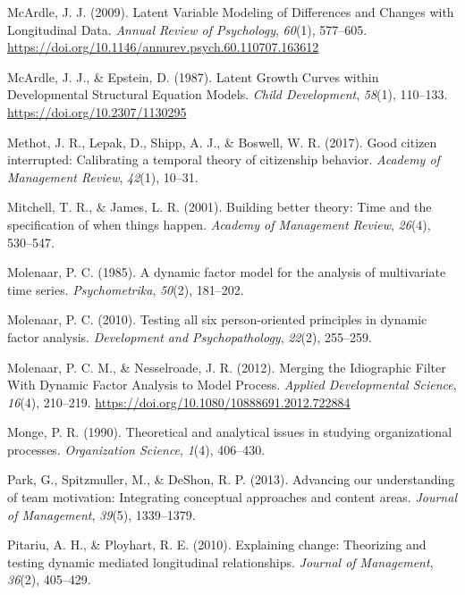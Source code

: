 \documentclass[english,,man]{apa6}
\begin{document}
\leavevmode\hypertarget{ref-mcardle_latent_2009}{}%
McArdle, J. J. (2009). Latent Variable Modeling of Differences and Changes with Longitudinal Data. \emph{Annual Review of Psychology}, \emph{60}(1), 577--605. \url{https://doi.org/10.1146/annurev.psych.60.110707.163612}

\leavevmode\hypertarget{ref-mcardle_latent_1987}{}%
McArdle, J. J., \& Epstein, D. (1987). Latent Growth Curves within Developmental Structural Equation Models. \emph{Child Development}, \emph{58}(1), 110--133. \url{https://doi.org/10.2307/1130295}

\leavevmode\hypertarget{ref-methot2017good}{}%
Methot, J. R., Lepak, D., Shipp, A. J., \& Boswell, W. R. (2017). Good citizen interrupted: Calibrating a temporal theory of citizenship behavior. \emph{Academy of Management Review}, \emph{42}(1), 10--31.

\leavevmode\hypertarget{ref-mitchell_building_2001}{}%
Mitchell, T. R., \& James, L. R. (2001). Building better theory: Time and the specification of when things happen. \emph{Academy of Management Review}, \emph{26}(4), 530--547.

\leavevmode\hypertarget{ref-molenaar_dynamic_1985}{}%
Molenaar, P. C. (1985). A dynamic factor model for the analysis of multivariate time series. \emph{Psychometrika}, \emph{50}(2), 181--202.

\leavevmode\hypertarget{ref-molenaar_testing_2010}{}%
Molenaar, P. C. (2010). Testing all six person-oriented principles in dynamic factor analysis. \emph{Development and Psychopathology}, \emph{22}(2), 255--259.

\leavevmode\hypertarget{ref-molenaar_merging_2012}{}%
Molenaar, P. C. M., \& Nesselroade, J. R. (2012). Merging the Idiographic Filter With Dynamic Factor Analysis to Model Process. \emph{Applied Developmental Science}, \emph{16}(4), 210--219. \url{https://doi.org/10.1080/10888691.2012.722884}

\leavevmode\hypertarget{ref-monge_theoretical_1990}{}%
Monge, P. R. (1990). Theoretical and analytical issues in studying organizational processes. \emph{Organization Science}, \emph{1}(4), 406--430.

\leavevmode\hypertarget{ref-park2013advancing}{}%
Park, G., Spitzmuller, M., \& DeShon, R. P. (2013). Advancing our understanding of team motivation: Integrating conceptual approaches and content areas. \emph{Journal of Management}, \emph{39}(5), 1339--1379.

\leavevmode\hypertarget{ref-pitariu_explaining_2010}{}%
Pitariu, A. H., \& Ployhart, R. E. (2010). Explaining change: Theorizing and testing dynamic mediated longitudinal relationships. \emph{Journal of Management}, \emph{36}(2), 405--429.
\end{document}
